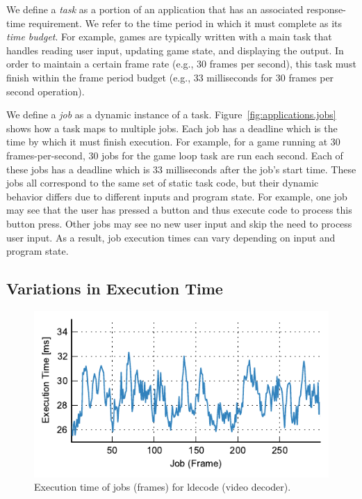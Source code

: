 We define a \emph{task} as a portion of an application that has an associated
response-time requirement. We refer to the time period in which it must
complete as its \emph{time budget}. For example, games are typically written with a
main task that
handles reading user input, updating game state, and displaying the output. In
order to maintain a certain frame rate (e.g., 30 frames per second), this task
must finish within the frame period budget (e.g., 33 milliseconds for 30
frames per second operation).

We define a \emph{job} as a dynamic instance of a task.
Figure~\ref{fig:applications.jobs} shows how a task maps to multiple jobs. Each
job has a deadline which is the time by which it must finish execution. For
example, for a game running at 30 frames-per-second, 30 jobs for the game loop
task are run each second. Each of these jobs has a deadline which is 33
milliseconds after the job's start time. These jobs all correspond to the same
set of static
task code, but their dynamic behavior differs due to different inputs and
program state. For example, one job may see that the user has pressed a button
and thus execute code to process this button press. Other jobs may see no new
user input and skip the need to process user input.  As a result, job execution
times can vary depending on input and program state.

\subsection{Variations in Execution Time}

\begin{figure}
  \begin{center}
    \includegraphics{exec_time_prediction/figs/ldecode_time.pdf}
    \caption{Execution time of jobs (frames) for ldecode (video decoder).}
    \label{fig:applications.ldecode_time}
  \end{center}
\end{figure}

